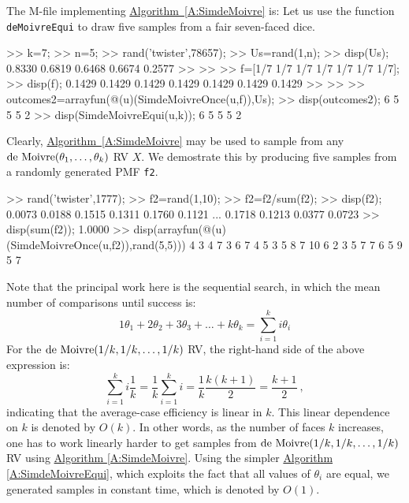 \begin{simulation}
The M-file implementing \hyperref[A:SimdeMoivre]{Algorithm~\ref*{A:SimdeMoivre}} is:
Let us use the function {\tt deMoivreEqui} to draw five samples from a fair seven-faced dice.
\begin{VrbM}
>> k=7; %
>> n=5; %
>> rand('twister',78657); %
>> Us=rand(1,n); %
>> disp(Us);
    0.8330    0.6819    0.6468    0.6674    0.2577
>> %
>> %
>> f=[1/7 1/7 1/7 1/7 1/7 1/7 1/7];
>> disp(f);
    0.1429    0.1429    0.1429    0.1429    0.1429    0.1429    0.1429
>> %
>> %
>> outcomes2=arrayfun(@(u)(SimdeMoivreOnce(u,f)),Us);
>> disp(outcomes2);
     6     5     5     5     2
>> disp(SimdeMoivreEqui(u,k)); %
     6     5     5     5     2
\end{VrbM}
Clearly, \hyperref[A:SimdeMoivre]{Algorithm~\ref*{A:SimdeMoivre}} may be used to sample from any $\mbox{{\rm de~Moivre}}(\theta_1,\ldots,\theta_k)$ RV $X$.  We demostrate this by producing five samples from a randomly generated PMF {\tt f2}.
\begin{VrbM}
>> rand('twister',1777); %
>> f2=rand(1,10); %
>> f2=f2/sum(f2); %
>> disp(f2); %
    0.0073    0.0188    0.1515    0.1311    0.1760    0.1121    ...
    0.1718    0.1213    0.0377    0.0723
>> disp(sum(f2)); %
    1.0000
>> disp(arrayfun(@(u)(SimdeMoivreOnce(u,f2)),rand(5,5))) %
     4     3     4     7     3
     6     7     4     5     3
     5     8     7    10     6
     2     3     5     7     7
     6     5     9     5     7
\end{VrbM}
\end{simulation}

Note that the principal work here is the sequential search, in which the mean number of comparisons until success is:
\[
1 \theta_1 + 2 \theta_2 + 3 \theta_3 + \ldots + k \theta_k = \sum_{i=1}^k{ i \theta_i}
\]
For the $\mbox{{\rm de~Moivre}}(1/k,1/k,\ldots,1/k)$ RV, the right-hand side of the above expression is:
\[
\sum_{i=1}^k{ i \frac{1}{k}} = \frac{1}{k} \sum_{i=1}^k{ i} = \frac{1}{k} \frac{k(k+1)}{2} = \frac{k+1}{2} \ ,
\]
indicating that the average-case efficiency is linear in $k$.  This linear dependence on $k$ is denoted by $O(k)$.  In other words, as the number of faces $k$ increases, one has to work linearly harder to get samples from $\mbox{{\rm de~Moivre}}(1/k,1/k,\ldots,1/k)$ RV using \hyperref[A:SimdeMoivre]{Algorithm \ref*{A:SimdeMoivre}}.  Using the simpler \hyperref[A:SimdeMoivreEqui]{Algorithm \ref*{A:SimdeMoivreEqui}}, which exploits the fact that all values of $\theta_i$  are equal, we generated samples in constant time, which is denoted by $O(1)$.


